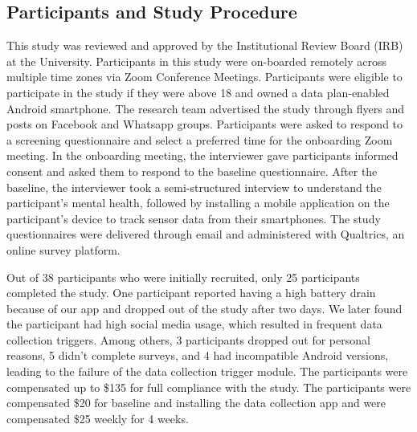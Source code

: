 \subsection{Participants and Study Procedure}
This study was reviewed and approved by the Institutional Review Board (IRB) at the University. Participants in this study were on-boarded remotely across multiple time zones via Zoom Conference Meetings. Participants were eligible to participate in the study if they were above 18 and owned a data plan-enabled Android smartphone. The research team advertised the study through flyers and posts on Facebook and Whatsapp groups. Participants were asked to respond to a screening questionnaire and select a preferred time for the onboarding Zoom meeting. In the onboarding meeting, the interviewer gave participants informed consent and asked them to respond to the baseline questionnaire. After the baseline, the interviewer took a semi-structured interview to understand the participant's mental health, followed by installing a mobile application on the participant's device to track sensor data from their smartphones. The study questionnaires were delivered through email and administered with Qualtrics, an online survey platform.

Out of 38 participants who were initially recruited, only 25 participants completed the study. One participant reported having a high battery drain because of our app and dropped out of the study after two days. We later found the participant had high social media usage, which resulted in frequent data collection triggers. Among others, 3 participants dropped out for personal reasons, 5 didn't complete surveys, and 4 had incompatible Android versions, leading to the failure of the data collection trigger module. The participants were compensated up to \$135 for full compliance with the study. The participants were compensated \$20 for baseline and installing the data collection app and were compensated \$25 weekly for 4 weeks. 
 

